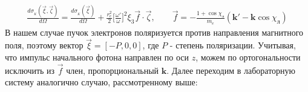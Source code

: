\documentclass[12pt]{article}
\begin{document}
\begin{equation}
\begin{split}
\frac{d \sigma_{_K}(\vec{\xi},\vec{\zeta})}{d\Omega} = \frac{d \sigma_{_K}(\vec{\xi})}{d\Omega} + \frac{r_e^2}{2} \bigg[\frac{\omega'}{\omega}\bigg]^2 \xi_3 \vec{f} \cdot \vec{\zeta}, \qquad \vec{f} = -\frac{1+\cos \chi_{\text{л}}}{m_e}(\mathbf{k}' - \mathbf{k}\cos \chi_{\text{л}})
\end{split}
\label{eq:comp_xsec_epol_erf}
\end{equation}
В нашем случае пучок электронов поляризуется против направления магнитного поля, поэтому вектор $\vec{\xi} = [-P,0,0]$, где $P$ - степень поляризации. Учитывая, что импульс начального фотона направлен по оси $z$, можем по ортогональности исключить из $\vec{f}$ член, пропорциональный $\mathbf{k}$. Далее переходим в лабораторную систему аналогично случаю, рассмотренному выше:
\end{document}

